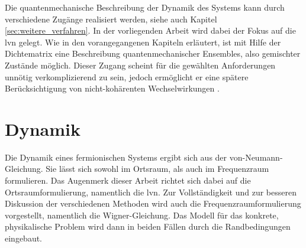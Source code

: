 Die quantenmechanische Beschreibung der Dynamik des Systems kann durch verschiedene Zugänge realisiert werden, siehe auch Kapitel \ref{sec:weitere_verfahren}. In der vorliegenden Arbeit wird dabei der Fokus auf die \ac{lvn} gelegt. Wie in den vorangegangenen Kapiteln erläutert, ist mit Hilfe der Dichtematrix eine Beschreibung quantenmechanischer Ensembles, also gemischter Zustände möglich. Dieser Zugang scheint für die gewählten Anforderungen unnötig verkomplizierend zu sein, jedoch ermöglicht er eine spätere Berücksichtigung von nicht-kohärenten Wechselwirkungen \cite{wiedenhaus}.


\section{Dynamik}
Die Dynamik eines fermionischen Systems ergibt sich aus der von-Neumann-Gleichung. Sie lässt sich sowohl im Ortsraum, als auch im Frequenzraum formulieren. Das Augenmerk dieser Arbeit richtet sich dabei auf die Ortsraumformulierung, namentlich die \ac{lvn}. Zur Vollständigkeit und zur besseren Diskussion der verschiedenen Methoden wird auch die Frequenzraumformulierung vorgestellt, namentlich die Wigner-Gleichung. Das Modell für das konkrete, physikalische Problem wird dann in beiden Fällen durch die Randbedingungen eingebaut.

